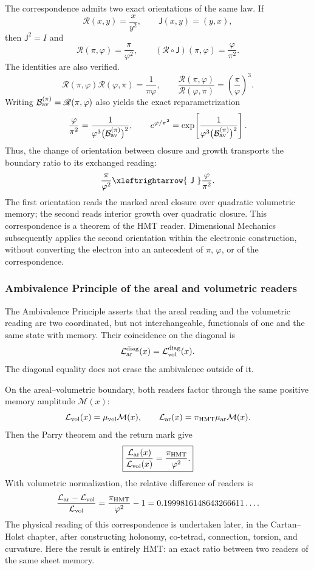 The correspondence admits two exact orientations of the same law. If
\[
 \mathscr R(x,y)=\frac{x}{y^2},
 \qquad
 \mathsf J(x,y)=(y,x),
\]
then \(\mathsf J^2=I\) and
\[
 \mathscr R(\pi,\varphi)=\frac{\pi}{\varphi^2},
 \qquad
 (\mathscr R\circ\mathsf J)(\pi,\varphi)
 =\frac{\varphi}{\pi^2}.
\]
The identities are also verified.
\[
 \mathscr R(\pi,\varphi)\mathscr R(\varphi,\pi)
 =\frac1{\pi\varphi},
 \qquad
 \frac{\mathscr R(\pi,\varphi)}
 {\mathscr R(\varphi,\pi)}
 =\left(\frac{\pi}{\varphi}\right)^3.
\]
Writing
\(\mathcal B_{\rm av}^{(\pi)}=\mathscr R(\pi,\varphi)\) also yields
the exact reparametrization
\[
 \frac{\varphi}{\pi^2}
 =
 \frac1{\varphi^3
 \bigl(\mathcal B_{\rm av}^{(\pi)}\bigr)^2},
 \qquad
 e^{\varphi/\pi^2}
 =
 \exp\!\left[
 \frac1{\varphi^3
 \bigl(\mathcal B_{\rm av}^{(\pi)}\bigr)^2}
 \right].
\]
Thus, the change of orientation between closure and growth transports the
boundary ratio to its exchanged reading:
\[
 \frac{\pi}{\varphi^2}
 \xleftrightarrow{\ \mathsf J\ }
 \frac{\varphi}{\pi^2}.
\]
The first orientation reads the marked areal closure over quadratic
volumetric memory; the second reads interior growth over
quadratic closure. This correspondence is a theorem of the HMT reader. Dimensional Mechanics subsequently applies the second orientation within the
electronic construction, without converting the electron into an antecedent of
\(\pi\), \(\varphi\), or of the correspondence.

\subsubsection{Ambivalence Principle of the areal and volumetric readers}
\label{sec:ambivalencia-grav-inercial-pi-phi2}

The Ambivalence Principle asserts that the areal reading and the
volumetric reading are two coordinated, but not interchangeable, functionals of one
and the same state with memory. Their coincidence on the diagonal is
\[
 \mathcal L_{\rm ar}^{\rm diag}(x)
 =\mathcal L_{\rm vol}^{\rm diag}(x).
\]
The diagonal equality does not erase the ambivalence outside of it.

On the areal--volumetric boundary, both readers factor through the same
positive memory amplitude \(\mathcal M(x)\):
\[
 \mathcal L_{\rm vol}(x)=\mu_{\rm vol}\mathcal M(x),
 \qquad
 \mathcal L_{\rm ar}(x)=
 \pi_{\rm HMT}\mu_{\rm ar}\mathcal M(x).
\]
Then the Parry theorem and the return mark give
\[
 \boxed{\displaystyle
 \frac{\mathcal L_{\rm ar}(x)}
 {\mathcal L_{\rm vol}(x)}
 =\frac{\pi_{\rm HMT}}{\varphi^2}.}
\]
With volumetric normalization, the relative difference of readers is
\[
 \frac{\mathcal L_{\rm ar}-\mathcal L_{\rm vol}}
 {\mathcal L_{\rm vol}}
 =
 \frac{\pi_{\rm HMT}}{\varphi^2}-1
 =
 0.1999816148643266611\ldots.
\]
The physical reading of this correspondence is undertaken later, in the
Cartan--Holst chapter, after constructing holonomy, co-tetrad, connection, torsion,
and curvature. Here the result is entirely HMT: an exact ratio between
two readers of the same sheet memory.

